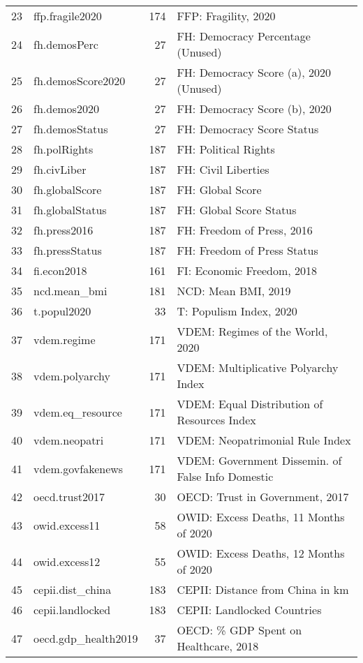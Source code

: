 \begin{longtable}{rlrl}
  23 & ffp.fragile2020 & 174 & FFP: Fragility, 2020 \\ 
  24 & fh.demosPerc & 27 & FH: Democracy Percentage (Unused) \\ 
  25 & fh.demosScore2020 & 27 & FH: Democracy Score (a), 2020 (Unused) \\ 
  26 & fh.demos2020 & 27 & FH: Democracy Score (b), 2020 \\ 
  27 & fh.demosStatus & 27 & FH: Democracy Score Status \\ 
  28 & fh.polRights & 187 & FH: Political Rights \\ 
  29 & fh.civLiber & 187 & FH: Civil Liberties \\ 
  30 & fh.globalScore & 187 & FH: Global Score \\ 
  31 & fh.globalStatus & 187 & FH: Global Score Status \\ 
  32 & fh.press2016 & 187 & FH: Freedom of Press, 2016 \\ 
  33 & fh.pressStatus & 187 & FH: Freedom of Press Status \\ 
  34 & fi.econ2018 & 161 & FI: Economic Freedom, 2018 \\ 
  35 & ncd.mean\_bmi & 181 & NCD: Mean BMI, 2019 \\ 
  36 & t.popul2020 & 33 & T: Populism Index, 2020 \\ 
  37 & vdem.regime & 171 & VDEM: Regimes of the World, 2020 \\ 
  38 & vdem.polyarchy & 171 & VDEM: Multiplicative Polyarchy Index \\ 
  39 & vdem.eq\_resource & 171 & VDEM: Equal Distribution of Resources Index \\ 
  40 & vdem.neopatri & 171 & VDEM: Neopatrimonial Rule Index \\ 
  41 & vdem.govfakenews & 171 & VDEM: Government Dissemin. of False Info Domestic \\ 
  42 & oecd.trust2017 & 30 & OECD: Trust in Government, 2017 \\ 
  43 & owid.excess11 & 58 & OWID: Excess Deaths, 11 Months of 2020 \\ 
  44 & owid.excess12 & 55 & OWID: Excess Deaths, 12 Months of 2020 \\ 
  45 & cepii.dist\_china & 183 & CEPII: Distance from China in km \\ 
  46 & cepii.landlocked & 183 & CEPII: Landlocked Countries \\ 
  47 & oecd.gdp\_health2019 & 37 & OECD: \% GDP Spent on Healthcare, 2018 \\ 

\end{longtable}
